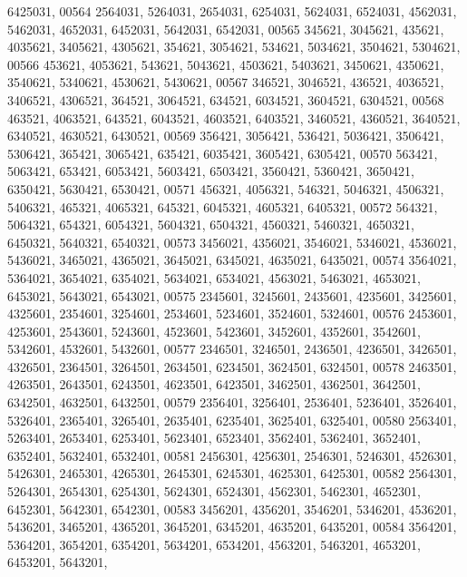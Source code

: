 \begin{DoxyCode}
      6425031,
00564       2564031, 5264031, 2654031, 6254031, 5624031, 6524031, 4562031, 5462031, 4652031, 6452031, 5642031, 
      6542031,
00565        345621, 3045621,  435621, 4035621, 3405621, 4305621,  354621, 3054621,  534621, 5034621, 3504621, 
      5304621,
00566        453621, 4053621,  543621, 5043621, 4503621, 5403621, 3450621, 4350621, 3540621, 5340621, 4530621, 
      5430621,
00567        346521, 3046521,  436521, 4036521, 3406521, 4306521,  364521, 3064521,  634521, 6034521, 3604521, 
      6304521,
00568        463521, 4063521,  643521, 6043521, 4603521, 6403521, 3460521, 4360521, 3640521, 6340521, 4630521, 
      6430521,
00569        356421, 3056421,  536421, 5036421, 3506421, 5306421,  365421, 3065421,  635421, 6035421, 3605421, 
      6305421,
00570        563421, 5063421,  653421, 6053421, 5603421, 6503421, 3560421, 5360421, 3650421, 6350421, 5630421, 
      6530421,
00571        456321, 4056321,  546321, 5046321, 4506321, 5406321,  465321, 4065321,  645321, 6045321, 4605321, 
      6405321,
00572        564321, 5064321,  654321, 6054321, 5604321, 6504321, 4560321, 5460321, 4650321, 6450321, 5640321, 
      6540321,
00573       3456021, 4356021, 3546021, 5346021, 4536021, 5436021, 3465021, 4365021, 3645021, 6345021, 4635021, 
      6435021,
00574       3564021, 5364021, 3654021, 6354021, 5634021, 6534021, 4563021, 5463021, 4653021, 6453021, 5643021, 
      6543021,
00575       2345601, 3245601, 2435601, 4235601, 3425601, 4325601, 2354601, 3254601, 2534601, 5234601, 3524601, 
      5324601,
00576       2453601, 4253601, 2543601, 5243601, 4523601, 5423601, 3452601, 4352601, 3542601, 5342601, 4532601, 
      5432601,
00577       2346501, 3246501, 2436501, 4236501, 3426501, 4326501, 2364501, 3264501, 2634501, 6234501, 3624501, 
      6324501,
00578       2463501, 4263501, 2643501, 6243501, 4623501, 6423501, 3462501, 4362501, 3642501, 6342501, 4632501, 
      6432501,
00579       2356401, 3256401, 2536401, 5236401, 3526401, 5326401, 2365401, 3265401, 2635401, 6235401, 3625401, 
      6325401,
00580       2563401, 5263401, 2653401, 6253401, 5623401, 6523401, 3562401, 5362401, 3652401, 6352401, 5632401, 
      6532401,
00581       2456301, 4256301, 2546301, 5246301, 4526301, 5426301, 2465301, 4265301, 2645301, 6245301, 4625301, 
      6425301,
00582       2564301, 5264301, 2654301, 6254301, 5624301, 6524301, 4562301, 5462301, 4652301, 6452301, 5642301, 
      6542301,
00583       3456201, 4356201, 3546201, 5346201, 4536201, 5436201, 3465201, 4365201, 3645201, 6345201, 4635201, 
      6435201,
00584       3564201, 5364201, 3654201, 6354201, 5634201, 6534201, 4563201, 5463201, 4653201, 6453201, 5643201, 

\end{DoxyCode}
